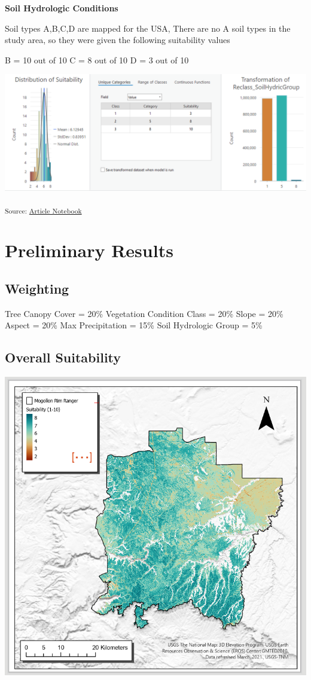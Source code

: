 \documentclass[
]{agujournal2019}
\begin{document}
\textbf{Soil Hydrologic Conditions}

Soil types A,B,C,D are mapped for the USA, There are no A soil types in
the study area, so they were given the following suitability values

B = 10 out of 10 C = 8 out of 10 D = 3 out of 10

\includegraphics{images/SoilHydrologicGroup_suitability.PNG}

\textsubscript{Source:
\href{https://Ryan3Lima.github.io/ATUR-ForestThinning/index.ipynb.html}{Article
Notebook}}

\section{Preliminary Results}\label{preliminary-results}

\subsection{Weighting}\label{weighting}

Tree Canopy Cover = 20\% Vegetation Condition Class = 20\% Slope = 20\%
Aspect = 20\% Max Precipitation = 15\% Soil Hydrologic Group = 5\%

\subsection{Overall Suitability}\label{overall-suitability}

\includegraphics{images/PreliminarySuitabilityMap.PNG}
\end{document}

